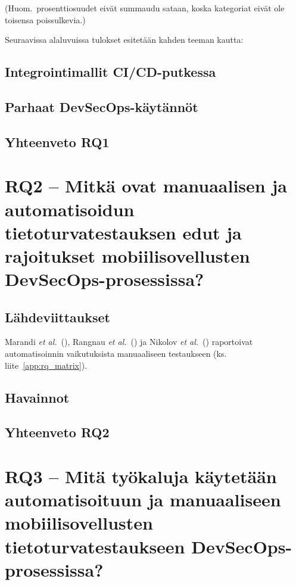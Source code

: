 \documentclass[bscthesis,finnish,oneside,biblatex]{uefcsthesis}
\begin{document}
(Huom.\ prosenttiosuudet eivät summaudu sataan, koska
kategoriat eivät ole toisensa poissulkevia.)

Seuraavissa alaluvuissa tulokset esitetään kahden teeman kautta:
\subsection{Integrointimallit CI/CD-putkessa}
\subsection{Parhaat DevSecOps-käytännöt}
\subsection*{Yhteenveto RQ1}

\section{RQ2 – Mitkä ovat manuaalisen ja automatisoidun tietoturvatestauksen edut ja rajoitukset mobiilisovellusten DevSecOps-prosessissa?}
\label{sec:rq2}

\subsection{Lähdeviittaukset}
Marandi \emph{et al.}\ (\citeyear{marandi2023_ias}),
Rangnau \emph{et al.}\ (\citeyear{putra2022_devsecops}) ja
Nikolov \emph{et al.}\ (\citeyear{rangnau2020_cst}) raportoivat automatisoinnin
vaikutuksista manuaaliseen testaukseen (ks. liite~\ref{app:rq_matrix}).

\subsection{Havainnot}

\subsection{Yhteenveto RQ2}


\section{RQ3 – Mitä työkaluja käytetään automatisoituun ja manuaaliseen mobiilisovellusten tietoturvatestaukseen DevSecOps-prosessissa?}
\label{sec:rq3}
\end{document}
